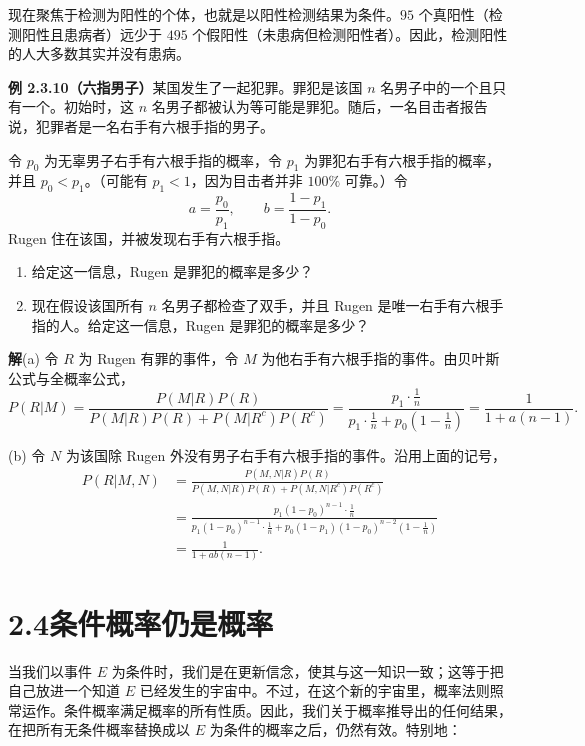 \documentclass[UTF8,12pt,a4paper,fontset=fandol]{ctexart}
\begin{document}
现在聚焦于检测为阳性的个体，也就是以阳性检测结果为条件。$95$ 个真阳性（检测阳性且患病者）远少于 $495$ 个假阳性（未患病但检测阳性者）。因此，检测阳性的人大多数其实并没有患病。

\noindent\textbf{例 2.3.10（六指男子）}\quad 某国发生了一起犯罪。罪犯是该国 $n$ 名男子中的一个且只有一个。初始时，这 $n$ 名男子都被认为等可能是罪犯。随后，一名目击者报告说，犯罪者是一名右手有六根手指的男子。

令 $p_0$ 为无辜男子右手有六根手指的概率，令 $p_1$ 为罪犯右手有六根手指的概率，并且 $p_0<p_1$。（可能有 $p_1<1$，因为目击者并非 $100\%$ 可靠。）令
\[
  a=\frac{p_0}{p_1},\qquad b=\frac{1-p_1}{1-p_0}.
\]
Rugen 住在该国，并被发现右手有六根手指。

\begin{enumerate}
  \item[(a)] 给定这一信息，Rugen 是罪犯的概率是多少？
  \item[(b)] 现在假设该国所有 $n$ 名男子都检查了双手，并且 Rugen 是唯一右手有六根手指的人。给定这一信息，Rugen 是罪犯的概率是多少？
\end{enumerate}

\noindent\textbf{解}\quad (a) 令 $R$ 为 Rugen 有罪的事件，令 $M$ 为他右手有六根手指的事件。由贝叶斯公式与全概率公式，
\[
  P(R|M)
  =
  \frac{P(M|R)P(R)}
       {P(M|R)P(R)+P(M|R^c)P(R^c)}
  =
  \frac{p_1\cdot \frac1n}
       {p_1\cdot \frac1n+p_0(1-\frac1n)}
  =
  \frac{1}{1+a(n-1)}.
\]

(b) 令 $N$ 为该国除 Rugen 外没有男子右手有六根手指的事件。沿用上面的记号，
\[
\begin{aligned}
  P(R|M,N)
  &=
  \frac{P(M,N|R)P(R)}
       {P(M,N|R)P(R)+P(M,N|R^c)P(R^c)} \\
  &=
  \frac{p_1(1-p_0)^{n-1}\cdot \frac1n}
       {p_1(1-p_0)^{n-1}\cdot \frac1n
        +p_0(1-p_1)(1-p_0)^{n-2}(1-\frac1n)} \\
  &=
  \frac{1}{1+ab(n-1)}.
\end{aligned}
\]

\section*{2.4\quad 条件概率仍是概率}

当我们以事件 $E$ 为条件时，我们是在更新信念，使其与这一知识一致；这等于把自己放进一个知道 $E$ 已经发生的宇宙中。不过，在这个新的宇宙里，概率法则照常运作。条件概率满足概率的所有性质。因此，我们关于概率推导出的任何结果，在把所有无条件概率替换成以 $E$ 为条件的概率之后，仍然有效。特别地：
\end{document}
